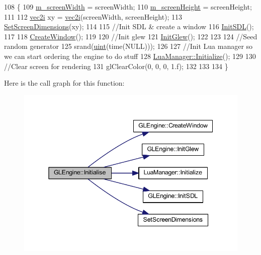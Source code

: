 \begin{DoxyCode}
108 \{
109   \hyperlink{class_g_l_engine_a9d34663f2b656c3c9e5af29e5e18a6e5}{m\_screenWidth} = screenWidth;
110   \hyperlink{class_g_l_engine_a18ac40a2dc119a5e2b2bc08e588016fe}{m\_screenHeight} = screenHeight;
111 
112   \hyperlink{_types_8h_abf8f3dd1636a08cb074d661110e0f4c0}{vec2i} xy = \hyperlink{_types_8h_abf8f3dd1636a08cb074d661110e0f4c0}{vec2i}(screenWidth, screenHeight);
113   \hyperlink{_screen_8h_a1f93317859b7a1195b7be36f8f2c216e}{SetScreenDimensions}(xy);
114   
115   \textcolor{comment}{//Init SDL & create a window}
116   \hyperlink{class_g_l_engine_aa1b26985e390b1befdc1d83248d4252f}{InitSDL}();
117 
118   \hyperlink{class_g_l_engine_a6a3de34ef35e375a701387a0b9c5d551}{CreateWindow}();
119 
120   \textcolor{comment}{//Init glew}
121   \hyperlink{class_g_l_engine_a3a91756215e75cf82c5af4e242b5416c}{InitGlew}();
122 
123 
124   \textcolor{comment}{//Seed random generator}
125   srand(\hyperlink{_types_8h_a4f5fce8c1ef282264f9214809524d836}{uint}(time(NULL)));
126 
127   \textcolor{comment}{//Init Lua manager so we can start ordering the engine to do stuff}
128   \hyperlink{class_lua_manager_ac0bf2dac2f4de45307df2bbcc75e61f3}{LuaManager::Initialize}();
129 
130   \textcolor{comment}{//Clear screen for rendering}
131   glClearColor(0, 0, 0, 1.f);
132 
133 
134 \}
\end{DoxyCode}


Here is the call graph for this function\+:
\nopagebreak
\begin{figure}[H]
\begin{center}
\leavevmode
\includegraphics[width=345pt]{class_g_l_engine_a8e0944601bd7a7f367ede6b37e9cf9a3_cgraph}
\end{center}
\end{figure}



